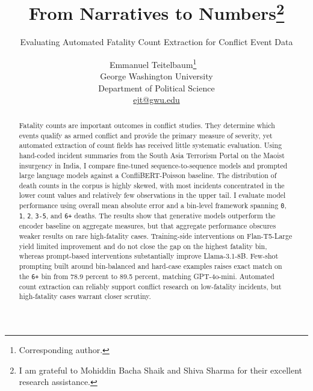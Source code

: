 \documentclass[
  11pt,
]{article}
\title{From Narratives to Numbers\thanks{I am grateful to Mohiddin Bacha
Shaik and Shiva Sharma for their excellent research assistance.}}
\subtitle{Evaluating Automated Fatality Count Extraction for Conflict
Event Data}
\author{Emmanuel Teitelbaum\thanks{Corresponding author.}
~\orcidlink{0000-0001-7089-0588}
\\George Washington University
\\Department of Political Science
\\\href{mailto:ejt@gwu.edu}{ejt@gwu.edu}
 }
\date{}  %
\newcommand{\published}[1]{%
   \gdef\puB{#1}}
\newcommand{\puB}{}
\begin{document}


\published{\textbf{2026-04-08} \qquad Prepared for the APSA Virtual
Research Meeting. \\ {\scriptsize Access the code, data, and analysis at
\url{https://github.com/eteitelbaum/code-satp.git}}}

\vspace{0.25in}

\maketitle

\vspace{0.25in}


\begin{abstract}
\noindent            %
Fatality counts are important outcomes in conflict studies. They
determine which events qualify as armed conflict and provide the primary
measure of severity, yet automated extraction of count fields has
received little systematic evaluation. Using hand-coded incident
summaries from the South Asia Terrorism Portal on the Maoist insurgency
in India, I compare fine-tuned sequence-to-sequence models and prompted
large language models against a ConfliBERT-Poisson baseline. The
distribution of death counts in the corpus is highly skewed, with most
incidents concentrated in the lower count values and relatively few
observations in the upper tail. I evaluate model performance using
overall mean absolute error and a bin-level framework spanning
\texttt{0}, \texttt{1}, \texttt{2}, \texttt{3-5}, and \texttt{6+}
deaths. The results show that generative models outperform the encoder
baseline on aggregate measures, but that aggregate performance obscures
weaker results on rare high-fatality cases. Training-side interventions
on Flan-T5-Large yield limited improvement and do not close the gap on
the highest fatality bin, whereas prompt-based interventions
substantially improve Llama-3.1-8B. Few-shot prompting built around
bin-balanced and hard-case examples raises exact match on the
\texttt{6+} bin from 78.9 percent to 89.5 percent, matching GPT-4o-mini.
Automated count extraction can reliably support conflict research on
low-fatality incidents, but high-fatality cases warrant closer scrutiny.
\end{abstract}
\end{document}

